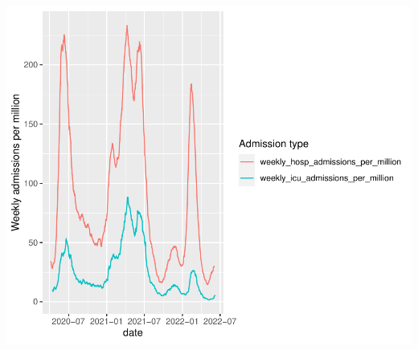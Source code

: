 \documentclass[11pt,preprint, authoryear]{elsarticle}
\numberwithin{equation}{section}
\numberwithin{figure}{section}
\numberwithin{table}{section}
\begin{document}
\includegraphics{Question1_files/figure-latex/unnamed-chunk-6-1.pdf}


\end{document}
